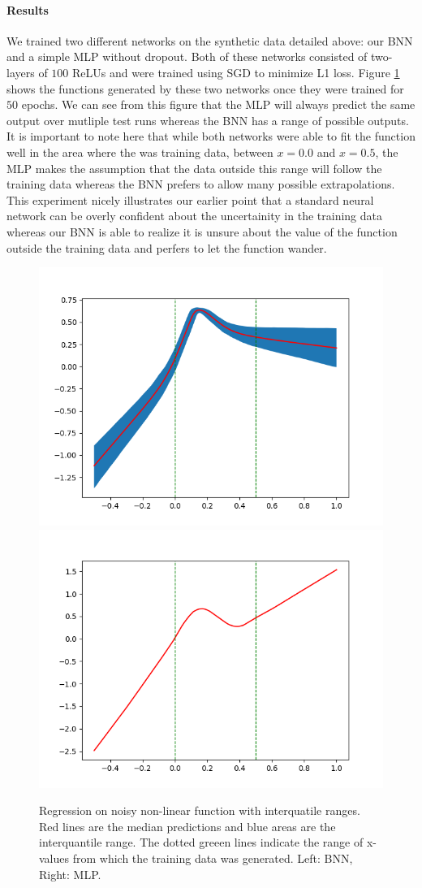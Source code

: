 \documentclass[11pt]{article}
\begin{document}
\paragraph{Results} 
We trained two different networks on the synthetic data detailed above: our BNN
and a simple MLP without dropout. Both of these networks consisted of two-layers 
of $100$ ReLUs and were trained using SGD to minimize L1 loss. Figure
\ref{fig:reg_extended} shows the functions generated by these two networks
once they were trained for $50$ epochs. We can see from this figure that the
MLP will always predict the same output over mutliple test runs whereas the BNN
has a range of possible outputs. It is important to note here that while both 
networks were able to fit the function well in the area where the was training
data, between $x=0.0$ and $x=0.5$, the MLP makes the assumption that the 
data outside this range will follow the training data whereas the BNN prefers
to allow many possible extrapolations. This experiment nicely illustrates our 
earlier point that a standard neural network can be overly confident about 
the uncertainity in the training data whereas our BNN is able to realize it 
is unsure about the value of the function outside the training data and
perfers to let the function wander.

\begin{figure}
  \centering\includegraphics[width=.45\textwidth]{figures/reg_bnn_extended.png}
  \centering\includegraphics[width=.45\textwidth]{figures/reg_mlp_extended.png}
  \caption{Regression on noisy non-linear function with interquatile ranges.
  Red lines are the median predictions and blue areas are the interquantile range.
	The dotted greeen lines indicate the range of x-values from which the training
  data was generated.
  Left: BNN, Right: MLP.}
  \label{fig:reg_extended}
\end{figure}
\end{document}
